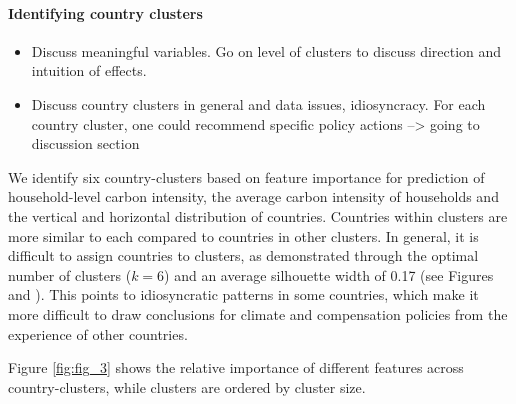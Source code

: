 \documentclass[12pt, a4paper]{article}
\begin{document}
\paragraph{Identifying country clusters}


\begin{itemize}
    \item Discuss meaningful variables. Go on level of clusters to discuss direction and intuition of effects.
    \item Discuss country clusters in general and data issues, idiosyncracy. For each country cluster, one could recommend specific policy actions --> going to discussion section
\end{itemize}

We identify six country-clusters based on feature importance for prediction of household-level carbon intensity, the average carbon intensity of households and the vertical and horizontal distribution of countries. Countries within clusters are more similar to each compared to countries in other clusters. In general, it is difficult to assign countries to clusters, as demonstrated through the optimal number of clusters ($k=6$) and an average silhouette width of 0.17 (see Figures  and ). This points to idiosyncratic patterns in some countries, which make it more difficult to draw conclusions for climate and compensation policies from the experience of other countries. 

Figure \ref{fig:fig_3} shows the relative importance of different features across country-clusters, while clusters are ordered by cluster size. 
\end{document}
